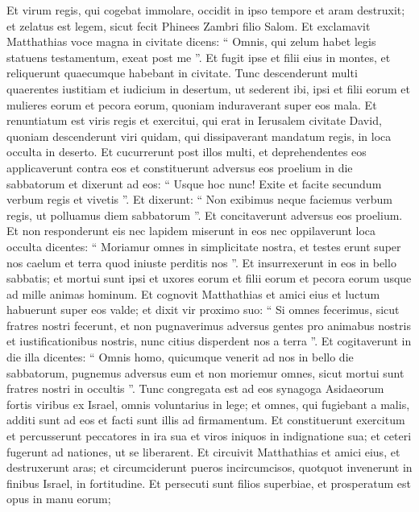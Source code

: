 \begin{biblechapter}
\begin{biblechapter}
\verse Et virum regis, qui cogebat immolare, occidit in ipso tempore et aram destruxit; 
\verse et zelatus est legem, sicut fecit Phinees Zambri filio Salom. 
\verse Et exclamavit Matthathias voce magna in civitate dicens: “ Omnis, qui zelum habet legis statuens testamentum, exeat post me ”. 
\verse Et fugit ipse et filii eius in montes, et reliquerunt quaecumque habebant in civitate. 
\verse Tunc descenderunt multi quaerentes iustitiam et iudicium in desertum, ut sederent ibi, 
\verse ipsi et filii eorum et mulieres eorum et pecora eorum, quoniam induraverant super eos mala.
 \verse Et renuntiatum est viris regis et exercitui, qui erat in Ierusalem civitate David, quoniam descenderunt viri quidam, qui dissipaverant mandatum regis, in loca occulta in deserto. 
\verse Et cucurrerunt post illos multi, et deprehendentes eos applicaverunt contra eos et constituerunt adversus eos proelium in die sabbatorum 
\verse et dixerunt ad eos: “ Usque hoc nunc! Exite et facite secundum verbum regis et vivetis ”. 
\verse Et dixerunt: “ Non exibimus neque faciemus verbum regis, ut polluamus diem sabbatorum ”. 
\verse Et concitaverunt adversus eos proelium. 
\verse Et non responderunt eis nec lapidem miserunt in eos nec oppilaverunt loca occulta 
\verse dicentes: “ Moriamur omnes in simplicitate nostra, et testes erunt super nos caelum et terra quod iniuste perditis nos ”. 
\verse Et insurrexerunt in eos in bello sabbatis; et mortui sunt ipsi et uxores eorum et filii eorum et pecora eorum usque ad mille animas hominum.
 \verse Et cognovit Matthathias et amici eius et luctum habuerunt super eos valde; 
 \verse et dixit vir proximo suo: “ Si omnes fecerimus, sicut fratres nostri fecerunt, et non pugnaverimus adversus gentes pro animabus nostris et iustificationibus nostris, nunc citius disperdent nos a terra ”. 
\verse Et cogitaverunt in die illa dicentes: “ Omnis homo, quicumque venerit ad nos in bello die sabbatorum, pugnemus adversus eum et non moriemur omnes, sicut mortui sunt fratres nostri in occultis ”. 
\verse Tunc congregata est ad eos synagoga Asidaeorum fortis viribus ex Israel, omnis voluntarius in lege; 
\verse et omnes, qui fugiebant a malis, additi sunt ad eos et facti sunt illis ad firmamentum. 
 \verse Et constituerunt exercitum et percusserunt peccatores in ira sua et viros iniquos in indignatione sua; et ceteri fugerunt ad nationes, ut se liberarent. 
 \verse Et circuivit Matthathias et amici eius, et destruxerunt aras; 
\verse et circumciderunt pueros incircumcisos, quotquot invenerunt in finibus Israel, in fortitudine. 
\verse Et persecuti sunt filios superbiae, et prosperatum est opus in manu eorum; 

\end{biblechapter}
\end{biblechapter}
